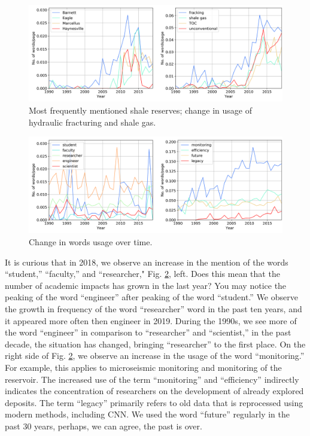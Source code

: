 \documentclass[geosciences,article,submit,moreauthors,pdftex]{Definitions/mdpi}
\begin{document}
\begin{figure}[ht!]

\includegraphics[width=\textwidth]{shale_frac.png}

\caption{Most frequently mentioned shale reserves; change in usage of hydraulic fracturing and shale gas.}
\label{shales_frac}
\end{figure}

\begin{figure}[ht!]
\includegraphics[width=\textwidth]{sigrams_int.png}
\caption{Change in words usage over time.}
\label{stu_faculty_mon}
\end{figure}


It is curious that in 2018, we observe an increase in the mention of the words ``student,'' ``faculty,'' and ``researcher," Fig. \ref{stu_faculty_mon}, left. Does this mean that the number of academic impacts has grown in the last year? You may notice the peaking of the word ``engineer'' after peaking of the word ``student.'' We observe the growth in frequency of the word ``researcher'' word in the past ten years, and it appeared more often then engineer in 2019. During the 1990s, we see more of the word ``engineer'' in comparison to ``researcher'' and ``scientist,'' in the past decade, the situation has changed, bringing ``researcher'' to the first place. On the right side of Fig. \ref{stu_faculty_mon}, we observe an increase in the usage of the word ``monitoring.'' For example, this applies to microseismic monitoring and monitoring of the reservoir. The increased use of the term ``monitoring'' and ``efficiency'' indirectly indicates the concentration of researchers on the development of already explored deposits. The term ``legacy'' primarily refers to old data that is reprocessed using modern methods, including CNN. We used the word ``future'' regularly in the past 30 years, perhaps, we can agree, the past is over.
\end{document}
